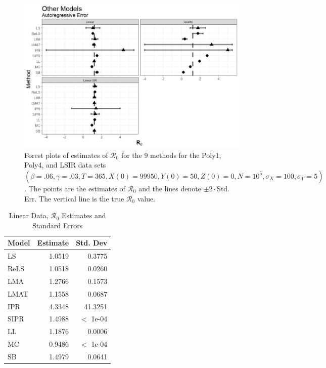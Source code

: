 \documentclass[12pt]{article}
\newcommand{\xxsir}{\ensuremath{9} } %
\newcommand{\rr}{\ensuremath{\mathcal{R}_0}}
\begin{document}
\begin{figure}[H]
	\begin{center}
		\includegraphics[scale=0.5]{images/other_ar.jpeg}
		\caption{Forest plots of estimates of $\rr$ for the \xxsir methods for the Poly1, Poly4, and LSIR data sets $(\beta=.06, \gamma=.03, T=365, X(0)=99950, Y(0)=50, Z(0)=0, N=10^5, \sigma_X=100, \sigma_Y=5)$.  The points are the estimates of $\rr$ and the lines denote $\pm 2\cdot $Std. Err.  The vertical line is the true $\rr$ value.}
	\end{center}
\end{figure}

\begin{table}[H]
	
	\centering
	\begin{tabular}[t]{l|r|r}
		\hline
		Model & Estimate & Std. Dev\\
		\hline
		LS & 1.0519 & 0.3775\\
		\hline
		ReLS & 1.0518 & 0.0260\\
		\hline
		LMA & 1.2766 & 0.1573\\
		\hline
		LMAT & 1.1558 & 0.0687\\
		\hline
		IPR & 4.3348 & 41.3251\\
		\hline
		SIPR & 1.4988 & $<$ 1e-04\\
		\hline
		LL & 1.1876 & 0.0006\\
		\hline
		MC & 0.9486 & $<$ 1e-04\\
		\hline
		SB & 1.4979 & 0.0641\\
		\hline
	\end{tabular}
	\caption{Linear Data, $\rr$ Estimates and Standard Errors}
\end{table}
\end{document}
